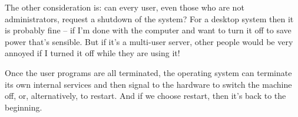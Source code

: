 The other consideration is: can every user, even those who are not administrators, request a shutdown of the system? For a desktop system then it is probably fine -- if I'm done with the computer and want to turn it off to save power that's sensible. But if it's a multi-user server, other people would be very annoyed if I turned it off while they are using it!

Once the user programs are all terminated, the operating system can terminate its own internal services and then signal to the hardware to switch the machine off, or, alternatively, to restart. And if we choose restart, then it's back to the beginning.



